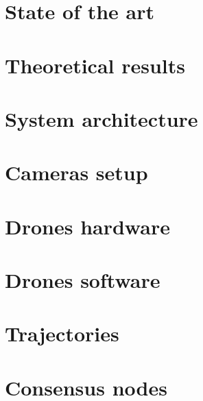\documentclass[a4paper,twoside,12pt]{book}
\begin{document}
\chapter{State of the art\label{chap:state_of_the_art}}


\chapter{Theoretical results\label{chap:theoretical_results}}


\chapter{System architecture\label{chap:system_architecture}}


\chapter{Cameras setup\label{chap:cameras_setup}}


\chapter{Drones hardware\label{chap:drones_hardware}}


\chapter{Drones software\label{chap:drones_software}}


\chapter{Trajectories\label{chap:trajectories}}


\chapter{Consensus nodes\label{chap:consensus_nodes}}

\end{document}

